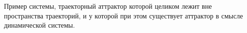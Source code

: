 
\LARGE



Пример системы, траекторный аттрактор которой целиком лежит вне пространства траекторий,
и у которой при этом существует аттрактор в смысле динамической системы.


